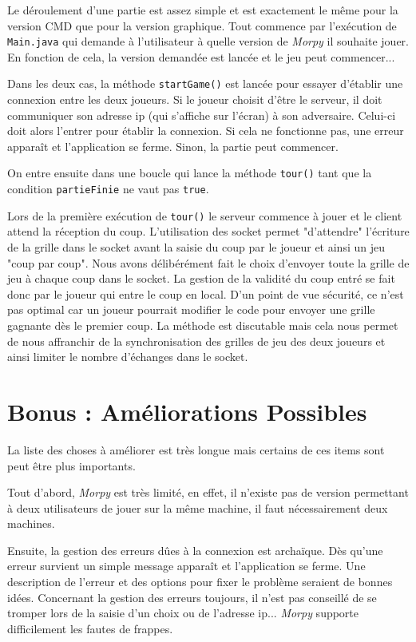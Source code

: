 \documentclass{report}
\begin{document}
Le déroulement d'une partie est assez simple et est exactement le même pour la version CMD que pour la version graphique. Tout commence par l'exécution de \texttt{Main.java} qui demande à l'utilisateur à quelle version de \emph{Morpy} il souhaite jouer.
En fonction de cela, la version demandée est lancée et le jeu peut commencer... 

Dans les deux cas, la méthode \texttt{startGame()} est lancée pour essayer d'établir une connexion entre les deux joueurs. Si le joueur choisit d'être le serveur, il doit communiquer son adresse ip (qui s'affiche sur l'écran) à son adversaire. Celui-ci doit alors l'entrer pour établir la connexion.
Si cela ne fonctionne pas, une erreur apparaît et l'application se ferme. Sinon, la partie peut commencer.

On entre ensuite dans une boucle qui lance la méthode \texttt{tour()} tant que la condition \texttt{partieFinie} ne vaut pas \texttt{true}.

Lors de la première exécution de \texttt{tour()} le serveur commence à jouer et le client attend la réception du coup. L'utilisation des socket permet "d'attendre" l'écriture de la grille dans le socket avant la saisie du coup par le joueur et ainsi un jeu "coup par coup".
Nous avons délibérément fait le choix d'envoyer toute la grille de jeu à chaque coup dans le socket. La gestion de la validité du coup entré se fait donc par le joueur qui entre le coup en local. D'un point de vue sécurité, ce n'est pas optimal car un joueur pourrait modifier le code pour envoyer une grille gagnante dès le premier coup.
La méthode est discutable mais cela nous permet de nous affranchir de la synchronisation des grilles de jeu des deux joueurs et ainsi limiter le nombre d'échanges dans le socket.


\section*{Bonus : Améliorations Possibles}

La liste des choses à améliorer est très longue mais certains de ces items sont peut être plus importants. 

Tout d'abord, \emph{Morpy} est très limité, en effet, il n'existe pas de version permettant à deux utilisateurs de jouer sur la même machine, il faut nécessairement deux machines.

Ensuite, la gestion des erreurs dûes à la connexion est archaïque. Dès qu'une erreur survient un simple message apparaît et l'application se ferme. Une description de l'erreur et des options pour fixer le problème seraient de bonnes idées. 
Concernant la gestion des erreurs toujours, il n'est pas conseillé de se tromper lors de la saisie d'un choix ou de l'adresse ip... \emph{Morpy} supporte difficilement les fautes de frappes.
\end{document}
